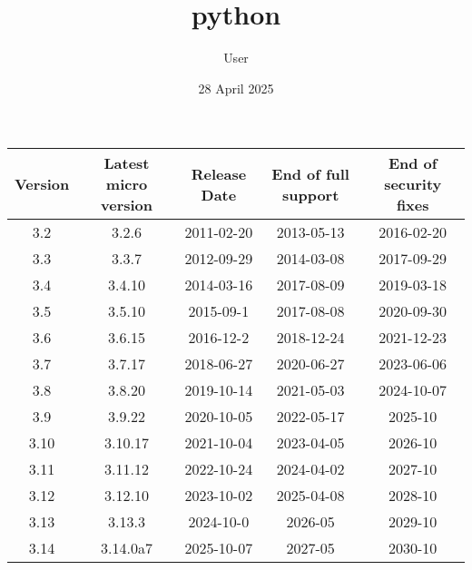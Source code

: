 \documentclass{article}
\title{python}
\author{ User }
\date{ 28 April 2025 }
\begin{document}
\begin{table}
    \centering
    \begin{tabular}{|c|c|c|c|c|}
        \hline 
        Version & Latest micro version & Release Date & End of full support & End of security fixes \\
        \hline 
        3.2 & 3.2.6 & 2011-02-20 & 2013-05-13 & 2016-02-20 \\
        \hline 
        3.3 & 3.3.7 & 2012-09-29 & 2014-03-08 & 2017-09-29 \\
        \hline 
        3.4 & 3.4.10 & 2014-03-16 & 2017-08-09 & 2019-03-18 \\
        \hline 
        3.5 & 3.5.10 & 2015-09-1 & 2017-08-08 & 2020-09-30 \\
        \hline 
        3.6 & 3.6.15 & 2016-12-2 & 2018-12-24 & 2021-12-23 \\
        \hline 
        3.7 & 3.7.17 & 2018-06-27 & 2020-06-27 & 2023-06-06 \\
        \hline 
        3.8 & 3.8.20 & 2019-10-14 & 2021-05-03 & 2024-10-07 \\
        \hline 
        3.9 & 3.9.22 & 2020-10-05 & 2022-05-17 & 2025-10 \\
        \hline 
        3.10 & 3.10.17 & 2021-10-04 & 2023-04-05 & 2026-10 \\
        \hline 
        3.11 & 3.11.12 & 2022-10-24 & 2024-04-02 & 2027-10 \\
        \hline 
        3.12 & 3.12.10 & 2023-10-02 & 2025-04-08 & 2028-10 \\
        \hline 
        3.13 & 3.13.3 & 2024-10-0 & 2026-05 & 2029-10 \\
        \hline 
        3.14 & 3.14.0a7 & 2025-10-07 & 2027-05 & 2030-10 \\
         \hline
    \end{tabular}
\end{table}
\end{document}
